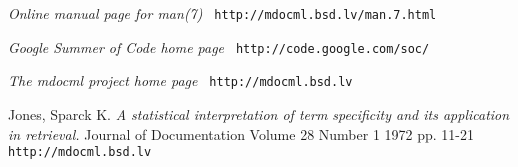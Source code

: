 \documentclass[letterpaper,twocolumn,10pt]{article}
\begin{document}
\begin{thebibliography}{20}
\emph{Online manual page for man(7)}
\newline
{\tt
http://mdocml.bsd.lv/man.7.html
}

\emph{Google Summer of Code home page}
\newline
{\tt
http://code.google.com/soc/
}

\emph {The mdocml project home page}
\newline
{\tt
http://mdocml.bsd.lv
}

Jones, Sparck K.
\emph {A statistical interpretation of term specificity and its application in retrieval.}
Journal of Documentation
Volume 28 Number 1 1972 pp. 11-21
\newline
{\tt
http://mdocml.bsd.lv
}

\end{thebibliography}

\theendnotes
\end{document}
